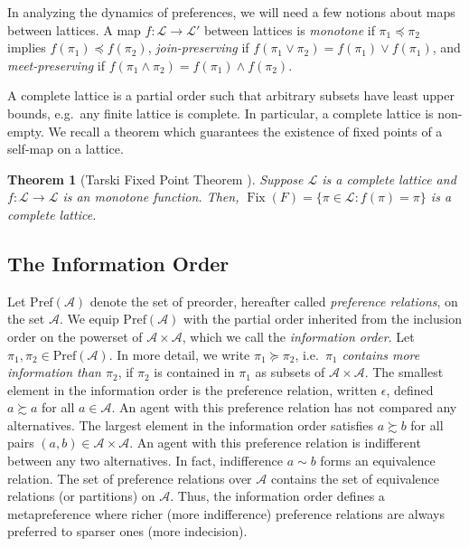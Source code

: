 \documentclass[conference]{ieeeconf}
\newcommand{\A}{\mathcal{A}}
\newcommand{\Pref}{\mathrm{Pref}}
\renewcommand{\L}{\mathcal{L}}
\newcommand{\prefers}{\succsim}
\newcommand{\join}{\vee}
\newcommand{\meet}{\wedge}
\DeclareMathOperator{\Fix}{Fix}
\newtheorem{theorem}{Theorem}
\begin{document}
In analyzing the dynamics of preferences, we will need a few notions about maps between lattices. A map $f: \L \to \L'$ between lattices is \emph{monotone} if $\pi_1 \preceq \pi_2$ implies $f(\pi_1) \preceq f(\pi_2)$, \emph{join-preserving} if $f(\pi_1 \join \pi_2) = f(\pi_1) \join f(\pi_1)$, and \emph{meet-preserving} if $f(\pi_1 \meet \pi_2) = f(\pi_1) \meet f(\pi_2)$.

A complete lattice is a partial order such that arbitrary subsets have least upper bounds, e.g.~any finite lattice is complete. In particular, a complete lattice is non-empty. We recall a theorem which guarantees the existence of fixed points of a self-map on a lattice.

\begin{theorem}[Tarski Fixed Point Theorem \cite{tarski}] \label{thm:tfpt}
    Suppose $\L$ is a complete lattice and $f: \L \to \L$ is an monotone function. Then, $\Fix(F) = \{ \pi \in \L: f(\pi) = \pi \}$ is a complete lattice.
\end{theorem}


\subsection{The Information Order}

Let $\Pref(\A)$ denote the set of preorder, hereafter called \emph{preference relations}, on the set $\A$. We equip $\Pref(\A)$ with the partial order inherited from the inclusion order on the powerset of $\A \times \A$, which we call the \emph{information order}. Let $\pi_1, \pi_2 \in \Pref(\A)$. In more detail, we write $\pi_1 \succeq \pi_2$, i.e.~{\it $\pi_1$ contains more information than $\pi_2$}, if $\pi_2$ is contained in $\pi_1$ as subsets of $\A \times \A$. The smallest element in the information order is the preference relation, written $\epsilon$, defined $a \prefers a$ for all $a \in \A$. An agent with this preference relation has not compared any alternatives. The largest element in the information order satisfies $a \prefers b$ for all pairs $(a,b) \in \A \times \A$. An agent with this preference relation is indifferent between any two alternatives. In fact, indifference $a \sim b$ forms an equivalence relation. The set of preference relations over $\A$ contains the set of equivalence relations (or partitions) on $\A$. Thus, the information order defines a metapreference where richer (more indifference) preference relations are always preferred to sparser ones (more indecision).
\end{document}
